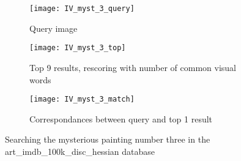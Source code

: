 \documentclass{article}
\begin{document}
\begin{figure}[ht!]
	\begin{subfigure}[b]{0.9\textwidth}
		\centering
		\texttt{[image: IV\_myst\_3\_query]}
		\caption{Query image}
		\label{fig:IV_31}
	\end{subfigure}

	\begin{subfigure}[b]{0.9\textwidth}
		\centering
		\texttt{[image: IV\_myst\_3\_top]}
		\caption{Top 9 results, rescoring with number of common visual words}
		\label{fig:IV_32}
	\end{subfigure}

	\begin{subfigure}[b]{0.9\textwidth}
		\centering
		\texttt{[image: IV\_myst\_3\_match]}
		\caption{Correspondances between query and top 1 result}
		\label{fig:IV_33}
	\end{subfigure}

	\caption{Searching the mysterious painting number three in the art\_imdb\_100k\_disc\_hessian database}
	\label{fig:IV_3}
\end{figure}
\end{document}

